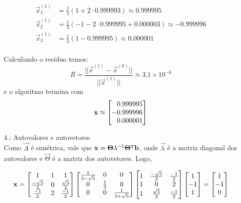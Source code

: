 \documentclass{homework}
\begin{document}
\begin{enumerate}[wide, leftmargin=80pt]
			\begin{align*}
				\vec{x}_1^{(1)} &= \frac{1}{3} (1 + 2 \cdot 0.999993) \approx 0.999995\\
				\vec{x}_2^{(1)} &= \frac{1}{3} (-1 - 2 \cdot 0.999995 + 0.000003) \approx -0.999996\\
				\vec{x}_3^{(1)} &= \frac{1}{3} (1 - 0.999995) \approx 0.000001\\
			\end{align*}
			
			Calculando o resíduo temos:
				$$R = \frac{||\vec{x}^{(1)} - \vec{x}^{(0)}||}{||\vec{x}^{(1)}||} \approx 3.1 \times 10^{-6}$$
			e o algoritmo termina com
				$$\vec{x} \approx \left[
				\begin{array}{@{}c@{}}
					\phantom{-}0.999995\\
					-0.999996\\
					\phantom{-}0.000001
				\end{array}
				\right]$$
			
			\item[4.: Autovalores e autovetores]~\\
			
			Como $\vec{A}$ é simétrica, vale que $\mathbf{x} = \mathbf{\Theta}\mathbf{\lambda}^{-1}\mathbf{\Theta}^{\text{\bfseries\tiny T}} \mathbf{b}$, onde $\vec{\lambda}$ é a matriz diagonal dos autovalores e $\vec{\Theta}$ é a matriz dos autovetores. Logo,
			
			\begin{align*}
				\vec{x} = \left[\begin{array}{@{}ccc@{}}
				1 & 1 & 1 \\
				\frac{-\sqrt{5}}{2} & 0 & \frac{\sqrt{5}}{2}\\
				\frac{-1}{2} & 2 & \frac{-1}{2}
				\end{array}\right]
				\left[\begin{array}{@{}ccc@{}}
				\frac{1}{3 - \sqrt{5}} & 0 & 0 \\
				0 & \frac{1}{3} & 0\\
				0 & 0 & \frac{1}{3 + \sqrt{5}}
				\end{array}\right]
				\left[\begin{array}{@{}ccc@{}}
				1 & \frac{-\sqrt{5}}{2} & \frac{-1}{2} \\
				1 & 0 & 2\\
				1 & \frac{\sqrt{5}}{2} & \frac{-1}{2}
				\end{array}\right]
				\left[\begin{array}{@{}c@{}}
				1 \\
				-1 \\
				1 
				\end{array}\right] = \left[\begin{array}{@{}c@{}}
				1 \\
				-1 \\
				0 
				\end{array}\right] 
			\end{align*}
		\end{enumerate}
	
\end{document}
